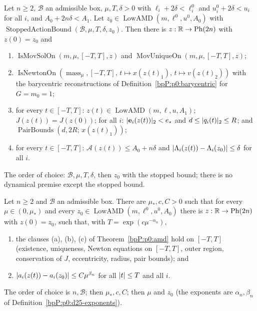 \begin{theorem}\label{bpP:p0:amd}
Let $n\ge2$, $\mathcal B$ an admissible box, $\mu,T,\delta>0$ with
$\ell_i+2\delta<\ell^0_i$ and $u^0_i+2\delta<u_i$ for all $i$, and $A_0+2n\delta<A_1$. Let $z_0\in\operatorname{LowAMD}(m,\ell^0,u^0,A_0)$ with $\operatorname{StoppedActionBound}(\mathcal B,\mu,T,\delta,z_0)$. Then there is $z:\mathbb{R}\to\mathrm{Ph}(2n)$ with $z(0)=z_0$ and
\begin{enumerate}[label=(\alph*)]
\item $\operatorname{IsMovSolOn}(m,\mu,[-T,T],z)$ and $\operatorname{MovUniqueOn}(m,\mu,[-T,T],z)$;
\item $\operatorname{IsNewtonOn}(\operatorname{mass}_\mu,[-T,T],\,t\mapsto x(z(t)_1),\,t\mapsto v(z(t)_2))$ with the barycentric reconstructions of Definition~\ref{bpP:p0:barycentric} for $G=m_0=1$;
\item for every $t\in[-T,T]$: $z(t)\in\operatorname{LowAMD}(m,\ell,u,A_1)$; $J(z(t))=J(z(0))$; for all $i$: $\lvert \mathbf e_i(z(t))\rvert_2<e_*$ and $d\le\lvert q_i(t)\rvert_2\le R$; and $\operatorname{PairBounds}(d,2R;\,x(z(t)_1))$;
\item for every $t\in[-T,T]$: $\mathcal A(z(t))\le A_0+n\delta$ and $\lvert \Lambda_i(z(t))-\Lambda_i(z_0)\rvert\le\delta$ for all $i$.
\end{enumerate}
The order of choice: $\mathcal B,\mu,T,\delta$, then $z_0$ with the stopped bound; there is no dynamical premise except the stopped bound.
\end{theorem}

\begin{theorem}\label{bpP:p0:expsafe}
Let $n\ge2$ and $\mathcal B$ an admissible box. There are $\mu_*,c,C>0$ such that for every $\mu\in(0,\mu_*)$ and every $z_0\in\operatorname{LowAMD}(m,\ell^0,u^0,A_0)$ there is $z:\mathbb{R}\to\mathrm{Ph}(2n)$ with $z(0)=z_0$, such that, with $T=\exp(c\mu^{-\alpha_n})$,
\begin{enumerate}[label=(\alph*)]
\item the clauses (a), (b), (c) of Theorem~\ref{bpP:p0:amd} hold on $[-T,T]$ (existence, uniqueness, Newton equations on $[-T,T]$, outer region, conservation of $J$, eccentricity, radius, pair bounds); and
\item $\lvert a_i(z(t))-a_i(z_0)\rvert\le C\mu^{\beta_n}$ for all $\lvert t\rvert\le T$ and all $i$.
\end{enumerate}
The order of choice is $n,\mathcal B$; then $\mu_*,c,C$; then $\mu$ and $z_0$ (the exponents are $\alpha_n,\beta_n$ of Definition~\ref{bpP:p0:d25-exponents}).
\end{theorem}
